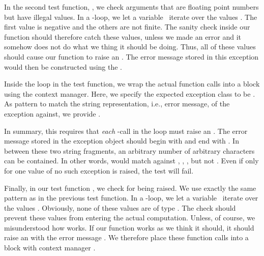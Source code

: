 In the second test function, , we check arguments that are floating point numbers but have illegal values.
In a -loop, we let a variable~ iterate over the values .
The first value is negative and the others are not finite.
The sanity check  inside our function should therefore catch these values, unless we made an error and it somehow does not do what we thing it should be doing.
Thus, all of these values should cause our  function to raise an .
The error message stored in this exception would then be constructed using the  .

Inside the loop in the test function, we wrap the actual function calls into a  block using the  context manager.
Here, we specify the expected exception class to be .
As pattern to match the string representation, i.e., error message, of the exception against, we provide .
%
\begin{sloppypar}%
In summary, this requires that \emph{each} -call in the loop must raise an .
The error message stored in the exception object should begin with  and end with .
In between these two string fragments, an arbitrary number of arbitrary characters can be contained.
In other words,  would match against , , , but not .
Even if only for one value of  no such exception is raised, the test will fail.%
\end{sloppypar}%
%
\begin{sloppypar}%
Finally, in our test function , we check for  being raised.
We use exactly the same pattern as in the previous test function.
In a -loop, we let a variable~ iterate over the values .
Obviously, none of these values are of type .
The check  should prevent these values from entering the actual computation.
Unless, of course, we misunderstood how  works.
If our function  works as we think it should, it should raise an  with the error message .
We therefore place these function calls into a  block with context manager .
\end{sloppypar}%
